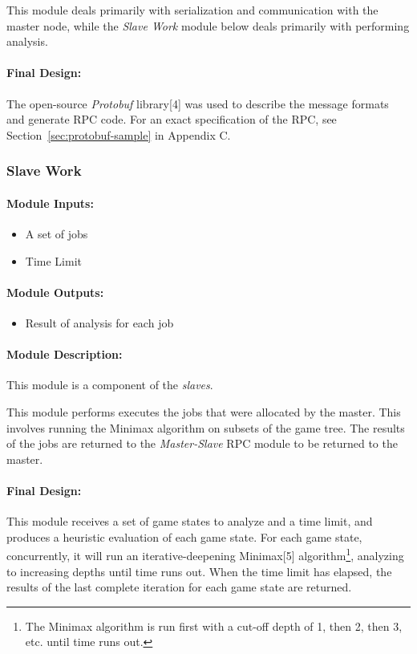 \documentclass[pdftex,12pt,a4paper]{article}
\begin{document}
This module deals primarily with serialization and communication with the master node, while the \emph{Slave Work} module below deals primarily with performing analysis.

\paragraph{Final Design:\\}
The open-source \emph{Protobuf} library[4] was used to describe the message formats and generate RPC code. For an exact specification of the RPC, see Section~\ref{sec:protobuf-sample} in Appendix C.


\subsubsection{Slave Work}

\paragraph{Module Inputs:}
\begin{itemize}
\item A set of jobs
\item Time Limit
\end{itemize}

\paragraph{Module Outputs:}
\begin{itemize}
\item Result of analysis for each job
\end{itemize}

\paragraph{Module Description:\\}
This module is a component of the \emph{slaves}.

This module performs executes the jobs that were allocated by the master. This involves running the Minimax algorithm on subsets of the game tree. The results of the jobs are returned to the \emph{Master-Slave} RPC module to be returned to the master.

\paragraph{Final Design:\\}
This module receives a set of game states to analyze and a time limit, and produces a heuristic evaluation of each game state. For each game state, concurrently, it will run an iterative-deepening Minimax[5] algorithm\footnote{The Minimax algorithm is run first with a cut-off depth of 1, then 2, then 3, etc. until time runs out.}, analyzing to increasing depths until time runs out. When the time limit has elapsed, the results of the last complete iteration for each game state are returned.
\end{document}

